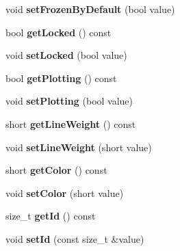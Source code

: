 \begin{DoxyCompactItemize}
\item 
void {\bfseries set\+Frozen\+By\+Default} (bool value)\hypertarget{class_c_a_d_layer_ace144c9fc2c59a198738cc65dc12c119}{}\label{class_c_a_d_layer_ace144c9fc2c59a198738cc65dc12c119}

\item 
bool {\bfseries get\+Locked} () const \hypertarget{class_c_a_d_layer_a47dfb61064763179050e7c99d1a2a2d7}{}\label{class_c_a_d_layer_a47dfb61064763179050e7c99d1a2a2d7}

\item 
void {\bfseries set\+Locked} (bool value)\hypertarget{class_c_a_d_layer_a5e893f778234b07cef2f897f009c774a}{}\label{class_c_a_d_layer_a5e893f778234b07cef2f897f009c774a}

\item 
bool {\bfseries get\+Plotting} () const \hypertarget{class_c_a_d_layer_ae572fcdb395fe585a5e7f767889e015b}{}\label{class_c_a_d_layer_ae572fcdb395fe585a5e7f767889e015b}

\item 
void {\bfseries set\+Plotting} (bool value)\hypertarget{class_c_a_d_layer_a286e918371dea97c696892c01c08dd97}{}\label{class_c_a_d_layer_a286e918371dea97c696892c01c08dd97}

\item 
short {\bfseries get\+Line\+Weight} () const \hypertarget{class_c_a_d_layer_a65c5a10007fe65362159531546b31fdc}{}\label{class_c_a_d_layer_a65c5a10007fe65362159531546b31fdc}

\item 
void {\bfseries set\+Line\+Weight} (short value)\hypertarget{class_c_a_d_layer_ab3f59ef7f14a88e85d7adf540074b811}{}\label{class_c_a_d_layer_ab3f59ef7f14a88e85d7adf540074b811}

\item 
short {\bfseries get\+Color} () const \hypertarget{class_c_a_d_layer_a6900a8f0a5a35e8b557ca26b478ff31c}{}\label{class_c_a_d_layer_a6900a8f0a5a35e8b557ca26b478ff31c}

\item 
void {\bfseries set\+Color} (short value)\hypertarget{class_c_a_d_layer_a2ff76d08d34007d0f665847fbfc61370}{}\label{class_c_a_d_layer_a2ff76d08d34007d0f665847fbfc61370}

\item 
size\+\_\+t {\bfseries get\+Id} () const \hypertarget{class_c_a_d_layer_a3034c92c58baf41dfb322f2d650a97d4}{}\label{class_c_a_d_layer_a3034c92c58baf41dfb322f2d650a97d4}

\item 
void {\bfseries set\+Id} (const size\+\_\+t \&value)\hypertarget{class_c_a_d_layer_ac2af17d2ca4cd847cb573b69bc5b8ba6}{}\label{class_c_a_d_layer_ac2af17d2ca4cd847cb573b69bc5b8ba6}


\end{DoxyCompactItemize}
